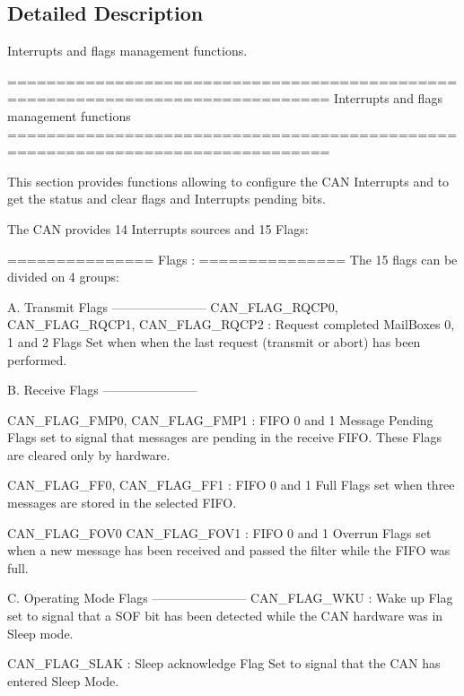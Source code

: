 \subsection{Detailed Description}
Interrupts and flags management functions. 

\begin{DoxyVerb} ===============================================================================
                   Interrupts and flags management functions
 ===============================================================================  

  This section provides functions allowing to configure the CAN Interrupts and 
  to get the status and clear flags and Interrupts pending bits.
  
  The CAN provides 14 Interrupts sources and 15 Flags:

  ===============  
      Flags :
  ===============
  The 15 flags can be divided on 4 groups: 

   A. Transmit Flags
  -----------------------
        CAN_FLAG_RQCP0, 
        CAN_FLAG_RQCP1, 
        CAN_FLAG_RQCP2  : Request completed MailBoxes 0, 1 and 2  Flags
                          Set when when the last request (transmit or abort) has 
                          been performed. 

  B. Receive Flags
  -----------------------

        CAN_FLAG_FMP0,
        CAN_FLAG_FMP1   : FIFO 0 and 1 Message Pending Flags 
                          set to signal that messages are pending in the receive 
                          FIFO.
                          These Flags are cleared only by hardware. 

        CAN_FLAG_FF0,
        CAN_FLAG_FF1    : FIFO 0 and 1 Full Flags
                          set when three messages are stored in the selected 
                          FIFO.                        

        CAN_FLAG_FOV0              
        CAN_FLAG_FOV1   : FIFO 0 and 1 Overrun Flags
                          set when a new message has been received and passed 
                          the filter while the FIFO was full.         

  C. Operating Mode Flags
  ----------------------- 
        CAN_FLAG_WKU    : Wake up Flag
                          set to signal that a SOF bit has been detected while 
                          the CAN hardware was in Sleep mode. 
        
        CAN_FLAG_SLAK   : Sleep acknowledge Flag
                          Set to signal that the CAN has entered Sleep Mode. 
    

\end{DoxyVerb}
